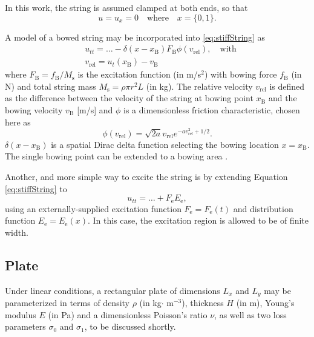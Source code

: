 \documentclass{article}
\begin{document}
In this work, the string is assumed clamped at both ends, so that
\begin{equation}\label{boundary}
    u = u_x = 0 \quad \text{where} \quad x = \{0, 1\}.
\end{equation}

A model of a bowed string \cite{Bilbao2009:NumericalSoundSynthesis} may be incorporated into \eqref{eq:stiffString} as  
\begin{align}
    \label{eq:bowedString} &u_{tt} = \hdots - \delta(x-x_\text{B})F_\text{B}\phi(v_\text{rel}), \quad \text{with} \\
    &v_\text{rel} = u_t(x_\text{B}) - v_\text{B}
\end{align}
where $F_\text{B} = f_\text{B}/ M_\text{s}$ is the excitation function (in m/s$^2$) with bowing force $f_\text{B}$ (in N) and total string mass $M_\text{s} = \rho\pi r^2 L$ (in kg). The relative velocity $v_\text{rel}$ is defined as the difference between the velocity of the string at bowing point $x_\text{B}$ and the bowing velocity $v_\text{B}$ [m/s] and $\phi$ is a dimensionless friction characteristic, chosen here as \cite{Bilbao2009:NumericalSoundSynthesis}
\begin{equation}
    \phi(v_\text{rel}) = \sqrt{2a}v_\text{rel} e^{-av_\text{rel}^2+1/2}.
\end{equation}
$\delta(x-x_\text{B})$ is a spatial Dirac delta function selecting the bowing location $x=x_\text{B}$. The single bowing point can be extended to a bowing area \cite{Bilbao2009:NumericalSoundSynthesis}.

Another, and more simple way to excite the string is by extending Equation \eqref{eq:stiffString} to
\begin{equation}
    \label{eq:excitedString} u_{tt} = \hdots + F_\text{e}E_\text{e},
\end{equation}
using an externally-supplied excitation function $F_\text{e} = F_\text{e}(t)$ and distribution function $E_\text{e} = E_\text{e}(x)$. In this case, the excitation region is allowed to be of finite width.
\subsection{Plate}\label{subsec:platePDE}
Under linear conditions, a rectangular plate of dimensions $L_{x}$ and $L_{y}$ may be parameterized in terms of density $\rho$ (in kg$\cdot$ m$^{-3}$), thickness $H$ (in m), Young's modulus $E$ (in Pa) and a dimensionless Poisson's ratio $\nu$, as well as two loss parameters $\sigma_{0}$ and $\sigma_{1}$, to be discussed shortly.  
\end{document}
